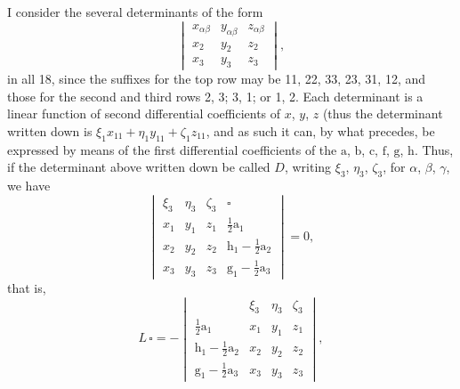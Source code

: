 \documentclass[11pt,a4paper]{article}
\begin{document}
I consider the several determinants of the form
\[
\begin{vmatrix} x_{\alpha\beta} & y_{\alpha\beta} & z_{\alpha\beta}\\ x_{2} & y_{2} & z_{2}\\ x_{3} & y_{3} & z_{3} \end{vmatrix},
\]
in all 18, since the suffixes for the top row may be 11, 22, 33, 23, 31, 12, and those for the second and third rows 2, 3; 3, 1; or 1, 2. Each determinant is a linear function of second differential coefficients of $x$, $y$, $z$ (thus the determinant written down is $\xi_{1}x_{11} + \eta_{1}y_{11} + \zeta_{1}z_{11}$, and as such it can, by what precedes, be expressed by means of the first differential coefficients of the $\text{a}$, $\text{b}$, $\text{c}$, $\text{f}$, $\text{g}$, $\text{h}$. Thus, if the determinant above written down be called $D$, writing $\xi_{3}$, $\eta_{3}$, $\zeta_{3}$, for $\alpha$, $\beta$, $\gamma$, we have
\[
\begin{vmatrix} \xi_{3} & \eta_{3} & \zeta_{3} & \square\\ x_{1} & y_{1} & z_{1} & \tfrac{1}{2}\text{a}_{1}\\ x_{2} & y_{2} & z_{2} & \text{h}_{1} - \tfrac{1}{2}\text{a}_{2}\\ x_{3} & y_{3} & z_{3} & \text{g}_{1} - \tfrac{1}{2}\text{a}_{3} \end{vmatrix} = 0,
\]
that is,
\[
L\,\square = -\begin{vmatrix} & \xi_{3} & \eta_{3} & \zeta_{3}\\ \tfrac{1}{2}\text{a}_{1} & x_{1} & y_{1} & z_{1}\\ \text{h}_{1} - \tfrac{1}{2}\text{a}_{2} & x_{2} & y_{2} & z_{2}\\ \text{g}_{1} - \tfrac{1}{2}\text{a}_{3} & x_{3} & y_{3} & z_{3} \end{vmatrix},
\]

\clearpage
\end{document}
